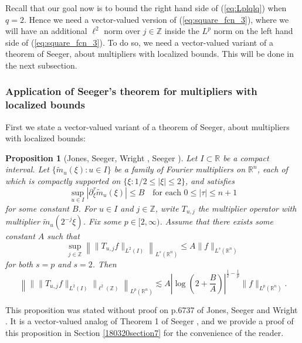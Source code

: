 \documentclass[12pt,leqno]{amsart}
\def\R{\mathbb{R}}
\def\Z{\mathbb{Z}}
\theoremstyle{plain}
\newtheorem{prop}[thm]{Proposition}
\numberwithin{equation}{section}
\begin{document}
Recall that our goal now is to bound the right hand side of (\ref{eq:Lplqlq}) when $q = 2$. Hence we need a vector-valued version of (\ref{eq:square_fcn_3}), where we will have an additional $\ell^2$ norm over $j \in \Z$ inside the $L^p$ norm on the left hand side of (\ref{eq:square_fcn_3}). To do so, we need a vector-valued variant of a theorem of Seeger, about multipliers with localized bounds. This will be done in the next subsection.

\subsubsection{Application of Seeger's theorem for multipliers with localized bounds} 

First we state a vector-valued variant of a theorem of Seeger, about multipliers with localized bounds:

\begin{prop} [Jones, Seeger, Wright \cite{MR2434308}, Seeger \cite{MR955772}] \label{prop:Seeger88}
Let $I \subset \R$ be a compact interval. Let $\{\tilde{m}_u(\xi) \colon u \in I \}$ be a family of Fourier multipliers on $\R^n$, each of which is compactly supported on $\{\xi \colon 1/2 \leq |\xi| \leq 2\}$, and satisfies
\[
\sup_{u \in I} |\partial_{\xi}^{\tau} \tilde{m}_u(\xi)| \leq B \quad \text{for each $0 \leq |\tau| \leq n+1$}
\]
for some constant $B$. For $u \in I$ and $j \in \Z$, write $T_{u,j}$ the multiplier operator with multiplier $\tilde{m}_u(2^{-j} \xi)$.
Fix some $p \in [2, \infty)$. Assume that there exists some constant $A$ such that
\begin{equation}  \label{eq:assump_1piece}
\sup_{j \in \Z} \left\| \| T_{u,j} f \|_{L^2(I)} \right\|_{L^s(\R^n)} \leq A \|f\|_{L^s(\R^n)} 
\end{equation}
for both $s = p$ and $s = 2$.
Then 
\[
\left\| \| \|T_{u,j} f\|_{L^2(I)} \|_{\ell^2(\Z)} \right\|_{L^p(\R^n)} \lesssim A \left| \log \left( 2 + \frac{B}{A} \right) \right|^{\frac{1}{2}-\frac{1}{p}} \|f\|_{L^p(\R^n)}.
\]
\end{prop}
This proposition was stated without proof on p.6737 of Jones, Seeger and Wright \cite{MR2434308}. It is a vector-valued analog of Theorem 1 of Seeger \cite{MR955772}, and we provide a proof of this proposition in Section \ref{180320section7} for the convenience of the reader. 
\end{document}
